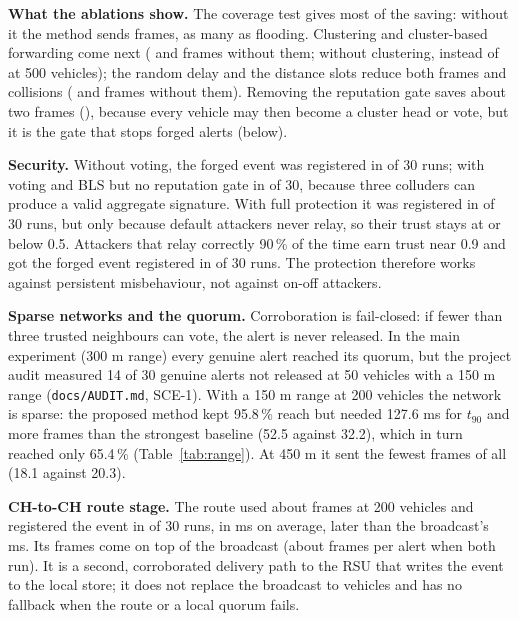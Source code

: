 \documentclass[11pt, a4paper]{article}
\begin{document}
\noindent\textbf{What the ablations show.} The coverage test gives most of the saving: without it the method sends
\NFrNoCov{} frames, as many as flooding. Clustering and cluster-based forwarding come next (\NFrNoClu{} and \NFrNoCluFwd{}
frames without them; without clustering, \NFrNoCluFiveH{} instead of \NFrPropFiveH{} at 500 vehicles); the random delay
and the distance slots reduce both frames and collisions (\NFrNoRad{} and \NFrNoSlots{} frames without them). Removing the reputation
gate saves about two frames (\NFrNoRep{}), because every vehicle may then become a cluster head or vote, but it is the
gate that stops forged alerts (below).

\noindent\textbf{Security.} Without voting, the forged event was registered in \NForgNoVote{} of 30 runs; with voting
and BLS but no reputation gate in \NForgVoteOnly{} of 30, because three colluders can produce a valid aggregate
signature. With full protection it was registered in \NForgFull{} of 30 runs, but only because default attackers never
relay, so their trust stays at or below 0.5. Attackers that relay correctly 90\,\% of the time earn trust near 0.9 and
got the forged event registered in \NForgOnOffNine{} of 30 runs. The protection therefore works against persistent
misbehaviour, not against on-off attackers.

\noindent\textbf{Sparse networks and the quorum.} Corroboration is fail-closed: if fewer than three trusted neighbours
can vote, the alert is never released. In the main experiment (300 m range) every genuine alert reached its quorum, but
the project audit measured 14 of 30 genuine alerts not released at 50 vehicles with a 150 m range
(\texttt{docs/AUDIT.md}, SCE-1). With a 150 m range at 200 vehicles the network is sparse: the proposed method kept
95.8\,\% reach but needed 127.6 ms for $t_{90}$ and more frames than the strongest baseline (52.5 against 32.2), which
in turn reached only 65.4\,\% (Table~\ref{tab:range}). At 450 m it sent the fewest frames of all (18.1 against 20.3).

\noindent\textbf{CH-to-CH route stage.} The route used about \NFrRoute{} frames at 200 vehicles and registered the event
in \NRsuRouteRuns{} of 30 runs, in \NRsuRoute{} ms on average, later than the broadcast's \NRsuProp{} ms. Its frames come
on top of the broadcast (about \NFrPropPlusRoute{} frames per alert when both run). It is a second, corroborated
delivery path to the RSU that writes the event to the local store; it does not replace the broadcast to vehicles and has
no fallback when the route or a local quorum fails.
\end{document}
